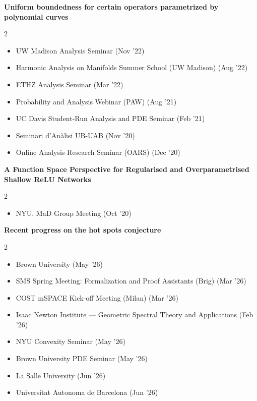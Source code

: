 \textbf{Uniform boundedness for certain operators parametrized by polynomial curves}
\nopagebreak
\begin{small}
\begin{multicols}{2}
\begin{itemize}\setlength\itemsep{0pt}
  \item UW Madison Analysis Seminar (Nov '22)
  \item Harmonic Analysis on Manifolds Summer School (UW Madison) (Aug '22)
  \item ETHZ Analysis Seminar (Mar '22)
  \item Probability and Analysis Webinar (PAW) (Aug '21)
  \item UC Davis Student-Run Analysis and PDE Seminar (Feb '21)
  \item Seminari d'Anàlisi UB-UAB (Nov '20)
  \item Online Analysis Research Seminar (OARS) (Dec '20)
\end{itemize}
\end{multicols}
\end{small}

\textbf{A Function Space Perspective for Regularised and Overparametrised Shallow ReLU Networks}
\nopagebreak
\begin{small}
\begin{multicols}{2}
\begin{itemize}\setlength\itemsep{0pt}
  \item NYU, MaD Group Meeting (Oct '20)
\end{itemize}
\end{multicols}
\end{small}

\textbf{Recent progress on the hot spots conjecture}
\nopagebreak
\begin{small}
\begin{multicols}{2}
\begin{itemize}\setlength\itemsep{0pt}
  \item Brown University (May '26)
  \item SMS Spring Meeting: Formalization and Proof Assistants (Brig) (Mar '26)
  \item COST mSPACE Kick-off Meeting (Milan) (Mar '26)
  \item Isaac Newton Institute — Geometric Spectral Theory and Applications (Feb '26)
  \item NYU Convexity Seminar (May '26)
  \item Brown University PDE Seminar (May '26)
  \item La Salle University (Jun '26)
  \item Universitat Autonoma de Barcelona (Jun '26)
\end{itemize}
\end{multicols}
\end{small}

